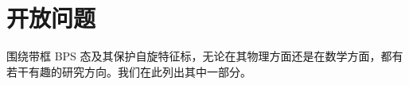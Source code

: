 
\section{开放问题}
\label{sec:Open-Problems}

围绕带框 BPS 态及其保护自旋特征标，无论在其物理方面还是在数学方面，都有若干有趣的研究方向。我们在此列出其中一部分。

